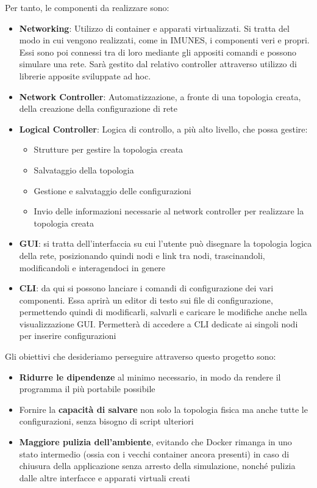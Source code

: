 Per tanto, le componenti da realizzare sono:
\begin{itemize}
    \item \textbf{Networking}: Utilizzo di container e apparati virtualizzati. Si tratta del modo in cui vengono realizzati, come in IMUNES, i componenti veri e propri. Essi sono poi connessi tra di loro mediante gli appositi comandi e possono simulare una rete. Sarà gestito dal relativo controller attraverso utilizzo di librerie apposite sviluppate ad hoc.
    \item \textbf{Network Controller}: Automatizzazione, a fronte di una topologia creata, della creazione della configurazione di rete
    \item \textbf{Logical Controller}: Logica di controllo, a più alto livello, che possa gestire:
          \begin{itemize}
              \item Strutture per gestire la topologia creata
              \item Salvataggio della topologia
              \item Gestione e salvataggio delle configurazioni
              \item Invio delle informazioni necessarie al network controller per realizzare la topologia creata
          \end{itemize}
    \item \textbf{GUI}: si tratta dell'interfaccia su cui l'utente può disegnare la topologia logica della rete, posizionando quindi nodi e link tra nodi, trascinandoli, modificandoli e interagendoci in genere
    \item \textbf{CLI}: da qui si possono lanciare i comandi di configurazione dei vari componenti. Essa aprirà un editor di testo sui file di configurazione, permettendo quindi di modificarli, salvarli e caricare le modifiche anche nella visualizzazione GUI. Permetterà di accedere a CLI dedicate ai singoli nodi per inserire configurazioni
\end{itemize}
Gli obiettivi che desideriamo perseguire attraverso questo progetto sono:
\begin{itemize}
    \item \textbf{Ridurre le dipendenze} al minimo necessario, in modo da rendere il programma il più portabile possibile
    \item Fornire la \textbf{capacità di salvare} non solo la topologia fisica ma anche tutte le configurazioni, senza bisogno di script ulteriori
    \item \textbf{Maggiore pulizia dell'ambiente}, evitando che Docker rimanga in uno stato intermedio (ossia con i vecchi container ancora presenti) in caso di chiusura della applicazione senza arresto della simulazione, nonché pulizia dalle altre interfacce e apparati virtuali creati
\end{itemize}



\newpage
